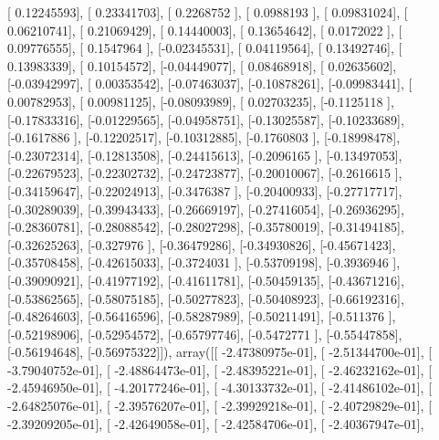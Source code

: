 \documentclass{article}
\begin{document}
       [ 0.12245593],
       [ 0.23341703],
       [ 0.2268752 ],
       [ 0.0988193 ],
       [ 0.09831024],
       [ 0.06210741],
       [ 0.21069429],
       [ 0.14440003],
       [ 0.13654642],
       [ 0.0172022 ],
       [ 0.09776555],
       [ 0.1547964 ],
       [-0.02345531],
       [ 0.04119564],
       [ 0.13492746],
       [ 0.13983339],
       [ 0.10154572],
       [-0.04449077],
       [ 0.08468918],
       [ 0.02635602],
       [-0.03942997],
       [ 0.00353542],
       [-0.07463037],
       [-0.10878261],
       [-0.09983441],
       [ 0.00782953],
       [ 0.00981125],
       [-0.08093989],
       [ 0.02703235],
       [-0.1125118 ],
       [-0.17833316],
       [-0.01229565],
       [-0.04958751],
       [-0.13025587],
       [-0.10233689],
       [-0.1617886 ],
       [-0.12202517],
       [-0.10312885],
       [-0.1760803 ],
       [-0.18998478],
       [-0.23072314],
       [-0.12813508],
       [-0.24415613],
       [-0.2096165 ],
       [-0.13497053],
       [-0.22679523],
       [-0.22302732],
       [-0.24723877],
       [-0.20010067],
       [-0.2616615 ],
       [-0.34159647],
       [-0.22024913],
       [-0.3476387 ],
       [-0.20400933],
       [-0.27717717],
       [-0.30289039],
       [-0.39943433],
       [-0.26669197],
       [-0.27416054],
       [-0.26936295],
       [-0.28360781],
       [-0.28088542],
       [-0.28027298],
       [-0.35780019],
       [-0.31494185],
       [-0.32625263],
       [-0.327976  ],
       [-0.36479286],
       [-0.34930826],
       [-0.45671423],
       [-0.35708458],
       [-0.42615033],
       [-0.3724031 ],
       [-0.53709198],
       [-0.3936946 ],
       [-0.39090921],
       [-0.41977192],
       [-0.41611781],
       [-0.50459135],
       [-0.43671216],
       [-0.53862565],
       [-0.58075185],
       [-0.50277823],
       [-0.50408923],
       [-0.66192316],
       [-0.48264603],
       [-0.56416596],
       [-0.58287989],
       [-0.50211491],
       [-0.511376  ],
       [-0.52198906],
       [-0.52954572],
       [-0.65797746],
       [-0.5472771 ],
       [-0.55447858],
       [-0.56194648],
       [-0.56975322]]), array([[ -2.47380975e-01],
       [ -2.51344700e-01],
       [ -3.79040752e-01],
       [ -2.48864473e-01],
       [ -2.48395221e-01],
       [ -2.46232162e-01],
       [ -2.45946950e-01],
       [ -4.20177246e-01],
       [ -4.30133732e-01],
       [ -2.41486102e-01],
       [ -2.64825076e-01],
       [ -2.39576207e-01],
       [ -2.39929218e-01],
       [ -2.40729829e-01],
       [ -2.39209205e-01],
       [ -2.42649058e-01],
       [ -2.42584706e-01],
       [ -2.40367947e-01],
\end{document}
